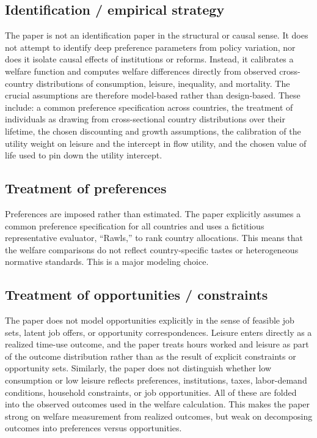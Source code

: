 \documentclass[11pt,a4paper]{article}
\begin{document}
\subsection*{Identification / empirical strategy}
The paper is not an identification paper in the structural or causal sense. It does not attempt to identify deep preference parameters from policy variation, nor does it isolate causal effects of institutions or reforms. Instead, it calibrates a welfare function and computes welfare differences directly from observed cross-country distributions of consumption, leisure, inequality, and mortality. The crucial assumptions are therefore model-based rather than design-based. These include: a common preference specification across countries, the treatment of individuals as drawing from cross-sectional country distributions over their lifetime, the chosen discounting and growth assumptions, the calibration of the utility weight on leisure and the intercept in flow utility, and the chosen value of life used to pin down the utility intercept.

\subsection*{Treatment of preferences}
Preferences are imposed rather than estimated. The paper explicitly assumes a common preference specification for all countries and uses a fictitious representative evaluator, “Rawls,” to rank country allocations. This means that the welfare comparisons do not reflect country-specific tastes or heterogeneous normative standards. This is a major modeling choice.

\subsection*{Treatment of opportunities / constraints}
The paper does not model opportunities explicitly in the sense of feasible job sets, latent job offers, or opportunity correspondences. Leisure enters directly as a realized time-use outcome, and the paper treats hours worked and leisure as part of the outcome distribution rather than as the result of explicit constraints or opportunity sets. Similarly, the paper does not distinguish whether low consumption or low leisure reflects preferences, institutions, taxes, labor-demand conditions, household constraints, or job opportunities. All of these are folded into the observed outcomes used in the welfare calculation. This makes the paper strong on welfare measurement from realized outcomes, but weak on decomposing outcomes into preferences versus opportunities.
\end{document}
